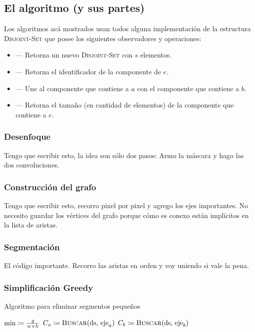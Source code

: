 \subsection{El algoritmo (y sus partes)}

Los algoritmos acá mostrados usan todos alguna implementación de la estructura
\textsc{Disjoint-Set} que posee los siguientes observadores y operaciones:

\begin{itemize}
	\item {}
		--- Retorna un nuevo \textsc{Disjoint-Set} con $s$ elementos.
	\item {}
		--- Retorna el identificador de la componente de $e$.
	\item {}
		--- Une al componente que contiene a $a$ con el componente que
		contiene a $b$.
	\item {}
		--- Retorna el tamaño (en cantidad de elementos) de la
		componente que contiene a $e$.
\end{itemize}

\subsubsection{Desenfoque}

Tengo que escribir esto, la idea son sólo dos pasos: Armo la máscara y hago las
dos convoluciones.

\subsubsection{Construcción del grafo}

Tengo que escribir esto, recorro pixel por pixel y agrego los ejes importantes.
No necesito guardar los vértices del grafo porque cómo es conexo están
implícitos en la lista de aristas.

\subsubsection{Segmentación}

El código importante. Recorro las aristas en orden y voy uniendo si vale la
pena.

\subsubsection{Simplificación Greedy}

\begin{algorithm}[h]
\caption{Algoritmo para eliminar segmentos pequeños}
\begin{algorithmic}[1]
\Statex{}
	\State{} $\text{min} \coloneqq \frac{g}{w \times h}$
			\State{} $C_a \is \Call{Buscar}{\text{ds, eje}_a}$
			\State{} $C_b \is \Call{Buscar}{\text{ds, eje}_b}$
				\State{} 
			\EndIf{}
		\EndIf{}
	\EndFor{}
\EndFunction{}
\end{algorithmic}
\end{algorithm}

